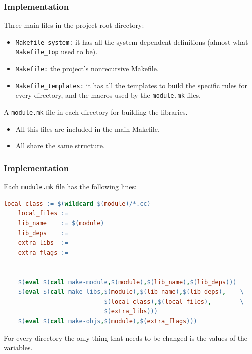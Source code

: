 \documentclass[11pt]{beamer}
\begin{document}

\begin{frame}
  \frametitle{Implementation}
  Three main files in the project root directory:

  \begin{itemize}
    \item \texttt{Makefile\_system:} it has all the system-dependent
      definitions (almost what \texttt{Makefile\_top} used to be).\\[2mm]
    \item \texttt{Makefile:} the project's nonrecursive Makefile.\\[2mm]
    \item \texttt{Makefile\_templates:} it has all the templates to build the
      specific rules for every directory, and the macros used by the
      \texttt{module.mk} files. 
  \end{itemize}

  \vspace{3mm}
  A \texttt{module.mk} file in each directory for building the libraries.

  \begin{itemize}
    \item All this files are included in the main Makefile.\\[2mm]
    \item All share the same structure.
  \end{itemize}
\end{frame}


\lstset{%
     showstringspaces = false,
     basicstyle=\scriptsize\ttfamily,
   }

\begin{frame}[fragile]
  \frametitle{Implementation}
  Each \texttt{module.mk} file has the following lines:

  \begin{lstlisting}[language=make]
    local_class := $(wildcard $(module)/*.cc)
    local_files :=
    lib_name    := $(module)
    lib_deps    :=
    extra_libs  :=
    extra_flags :=
    
    
    $(eval $(call make-module,$(module),$(lib_name),$(lib_deps)))
    $(eval $(call make-libs,$(module),$(lib_name),$(lib_deps),    \
                            $(local_class),$(local_files),        \
                            $(extra_libs)))
    $(eval $(call make-objs,$(module),$(extra_flags)))
  \end{lstlisting}

  \pause
  For every directory the only thing that needs to be changed is the values of
  the variables.
\end{frame}
\end{document}
